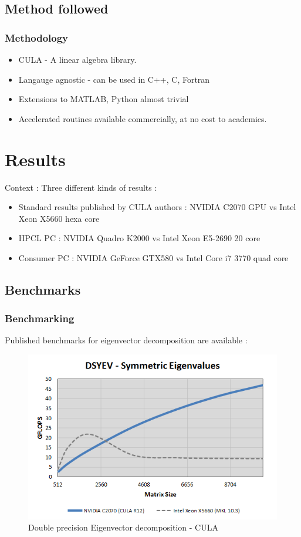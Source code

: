 \documentclass{beamer}
\begin{document}
\subsection{Method followed}
\begin{frame}
\frametitle{Methodology}
\begin{itemize}
\item
CULA - A linear algebra library.
\item
Langauge agnostic - can be used in C++, C, Fortran
\item
Extensions to MATLAB, Python almost trivial
\item
Accelerated routines available commercially, at no cost to academics. 
\end{itemize}
\end{frame}

\section{Results}
\begin{frame}
Context : Three different kinds of results : 

\begin{itemize}
\item
Standard results published by CULA authors : NVIDIA C2070 GPU vs Intel Xeon X5660 hexa core
\item
HPCL PC : NVIDIA Quadro K2000 vs Intel Xeon E5-2690 20 core
\item
Consumer PC : NVIDIA GeForce GTX580 vs Intel Core i7 3770 quad core
\end{itemize}
\end{frame}
\subsection{Benchmarks}
\begin{frame}
\frametitle{Benchmarking}
Published benchmarks for eigenvector decomposition are available : 

\begin{figure}[H]
 \includegraphics[scale=0.5]{DSYEV_N.png}
 \caption{Double precision Eigenvector decomposition - CULA}
 \label{dsyev}
\end{figure}
\end{frame}
\end{document}
